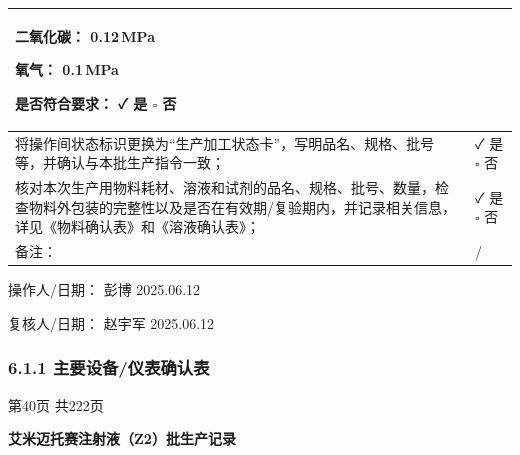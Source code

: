 \documentclass[UTF8,10pt,a4paper,fontset=fandol]{ctexart}
\newcommand{\fieldvalue}[1]{#1}
\newcommand{\handwritten}[1]{#1}
\begin{document}
\begin{tabularx}{\textwidth}{|p{}|X|}
二氧化碳：
\fieldvalue{\handwritten{0.12}}\,MPa

氧气：
\fieldvalue{\handwritten{0.1}}\,MPa

是否符合要求：
\fieldvalue{\handwritten{✓}} 是 \quad $\square$ 否 \\
\hline
将操作间状态标识更换为“生产加工状态卡”，写明品名、规格、批号等，并确认与本批生产指令一致； &
\fieldvalue{\handwritten{✓}} 是 \quad $\square$ 否 \\
\hline
核对本次生产用物料耗材、溶液和试剂的品名、规格、批号、数量，检查物料外包装的完整性以及是否在有效期/复验期内，并记录相关信息，详见《物料确认表》和《溶液确认表》； &
\fieldvalue{\handwritten{✓}} 是 \quad $\square$ 否 \\
\hline
备注： &
\fieldvalue{\handwritten{/}} \\
\hline
\end{tabularx}

\noindent
操作人/日期：
\fieldvalue{\handwritten{彭博}}
\quad
\fieldvalue{\handwritten{2025.06.12}}

\hfill
复核人/日期：
\fieldvalue{\handwritten{赵宇军}}
\quad
\fieldvalue{\handwritten{2025.06.12}}

\subsubsection{6.1.1 主要设备/仪表确认表}

\begin{center}
第40页 共222页
\end{center}

\newpage

\begin{center}
\textbf{艾米迈托赛注射液（Z2）批生产记录}
\end{center}
\end{document}
